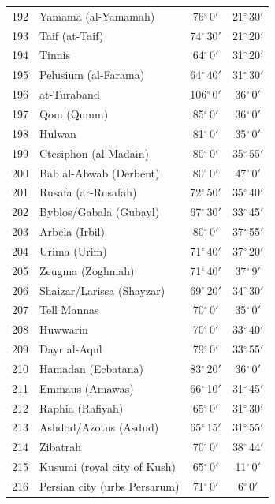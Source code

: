 \documentclass[10pt,a4paper]{article}
\begin{document}
\begin{longtable}{r >{\raggedright\arraybackslash}p{8.5cm} c c}
192 & Yamama (al-Yamamah) & 76$^\circ$\,0$'$ & 21$^\circ$\,30$'$\\
193 & Taif (at-Taif) & 74$^\circ$\,30$'$ & 21$^\circ$\,20$'$\\
194 & Tinnis & 64$^\circ$\,0$'$ & 31$^\circ$\,20$'$\\
195 & Pelusium (al-Farama) & 64$^\circ$\,40$'$ & 31$^\circ$\,30$'$\\
196 & at-Turaband & 106$^\circ$\,0$'$ & 36$^\circ$\,0$'$\\
197 & Qom (Qumm) & 85$^\circ$\,0$'$ & 36$^\circ$\,0$'$\\
198 & Hulwan & 81$^\circ$\,0$'$ & 35$^\circ$\,0$'$\\
199 & Ctesiphon (al-Madain) & 80$^\circ$\,0$'$ & 35$^\circ$\,55$'$\\
200 & Bab al-Abwab (Derbent) & 80$^\circ$\,0$'$ & 47$^\circ$\,0$'$\\
201 & Rusafa (ar-Rusafah) & 72$^\circ$\,50$'$ & 35$^\circ$\,40$'$\\
202 & Byblos/Gabala (Gubayl) & 67$^\circ$\,30$'$ & 33$^\circ$\,45$'$\\
203 & Arbela (Irbil) & 80$^\circ$\,0$'$ & 37$^\circ$\,55$'$\\
204 & Urima (Urim) & 71$^\circ$\,40$'$ & 37$^\circ$\,20$'$\\
205 & Zeugma (Zoghmah) & 71$^\circ$\,40$'$ & 37$^\circ$\,9$'$\\
206 & Shaizar/Larissa (Shayzar) & 69$^\circ$\,20$'$ & 34$^\circ$\,30$'$\\
207 & Tell Mannas & 70$^\circ$\,0$'$ & 35$^\circ$\,0$'$\\
208 & Huwwarin & 70$^\circ$\,0$'$ & 33$^\circ$\,40$'$\\
209 & Dayr al-Aqul & 79$^\circ$\,0$'$ & 33$^\circ$\,55$'$\\
210 & Hamadan (Ecbatana) & 83$^\circ$\,20$'$ & 36$^\circ$\,0$'$\\
211 & Emmaus (Amawas) & 66$^\circ$\,10$'$ & 31$^\circ$\,45$'$\\
212 & Raphia (Rafiyah) & 65$^\circ$\,0$'$ & 31$^\circ$\,30$'$\\
213 & Ashdod/Azotus (Asdud) & 65$^\circ$\,15$'$ & 31$^\circ$\,55$'$\\
214 & Zibatrah & 70$^\circ$\,0$'$ & 38$^\circ$\,44$'$\\
215 & Kusumi (royal city of Kush) & 65$^\circ$\,0$'$ & 11$^\circ$\,0$'$\\
216 & Persian city (urbs Persarum) & 71$^\circ$\,0$'$ & 6$^\circ$\,0$'$\\

\end{longtable}
\end{document}
